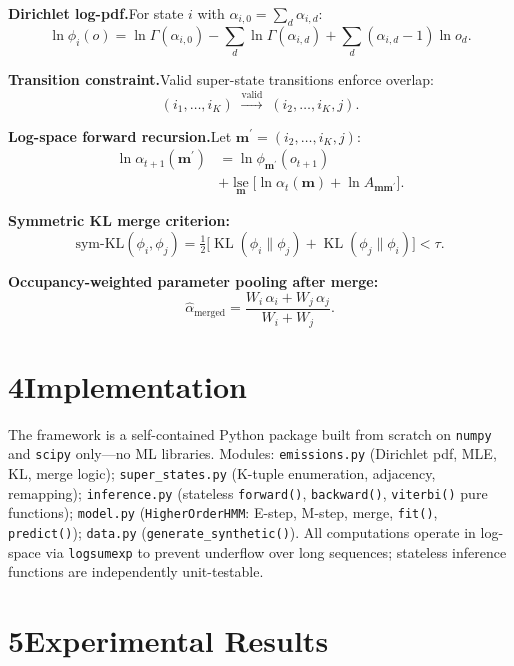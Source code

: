 \documentclass[10pt,a4paper,twocolumn]{article}
\DeclareMathOperator{\KL}{KL}
\newcommand{\symKL}{\mathrm{sym\text{-}KL}}
\begin{document}
\textbf{Dirichlet log-pdf.}\enspace For state $i$ with $\alpha_{i,0}=\sum_d\alpha_{i,d}$:
\[
  \ln\phi_i(o)=\ln\Gamma(\alpha_{i,0})-\sum_d\ln\Gamma(\alpha_{i,d})+\sum_d(\alpha_{i,d}-1)\ln o_d.
\]

\textbf{Transition constraint.}\enspace Valid super-state transitions enforce overlap:
\[
  (i_1,\ldots,i_K)\;\xrightarrow{\text{valid}}\;(i_2,\ldots,i_K,j).
\]

\textbf{Log-space forward recursion.}\enspace Let $\mathbf{m}^{\prime}=(i_2,\ldots,i_K,j)$:
\begin{align*}
  \ln\alpha_{t+1}(\mathbf{m}^{\prime})&=\ln\phi_{\mathbf{m}^{\prime}}(o_{t+1})\\
  &+\operatorname*{lse}_{\mathbf{m}}\!\bigl[\ln\alpha_t(\mathbf{m})+\ln A_{\mathbf{m}\mathbf{m}^{\prime}}\bigr].
\end{align*}

\textbf{Symmetric KL merge criterion:}
\[
  \symKL(\phi_i,\phi_j)=\tfrac{1}{2}\bigl[\KL(\phi_i\|\phi_j)+\KL(\phi_j\|\phi_i)\bigr]<\tau.
\]

\textbf{Occupancy-weighted parameter pooling after merge:}
\[
  \hat{\alpha}_{\mathrm{merged}}=\frac{W_i\,\alpha_i+W_j\,\alpha_j}{W_i+W_j}.
\]

\section*{4\enspace Implementation}

The framework is a self-contained Python package built from scratch on \texttt{numpy} and \texttt{scipy} only---no ML libraries.
Modules: \texttt{emissions.py} (Dirichlet pdf, MLE, KL, merge logic); \texttt{super\_states.py} (K-tuple enumeration, adjacency, remapping); \texttt{inference.py} (stateless \texttt{forward()}, \texttt{backward()}, \texttt{viterbi()} pure functions); \texttt{model.py} (\texttt{HigherOrderHMM}: E-step, M-step, merge, \texttt{fit()}, \texttt{predict()}); \texttt{data.py} (\texttt{generate\_synthetic()}).
All computations operate in log-space via \texttt{logsumexp} to prevent underflow over long sequences; stateless inference functions are independently unit-testable.

\section*{5\enspace Experimental Results}
\end{document}
